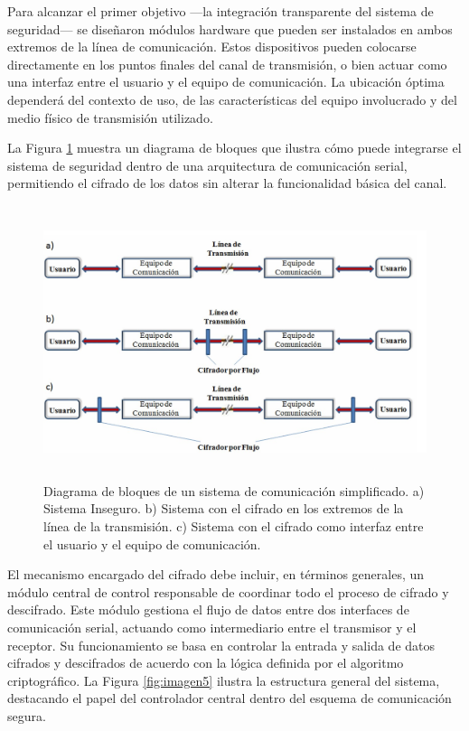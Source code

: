 Para alcanzar el primer objetivo —la integración transparente del sistema de seguridad— se diseñaron módulos hardware que pueden ser instalados en ambos extremos de la línea de comunicación. Estos dispositivos pueden colocarse directamente en los puntos finales del canal de transmisión, o bien actuar como una interfaz entre el usuario y el equipo de comunicación. La ubicación óptima dependerá del contexto de uso, de las características del equipo involucrado y del medio físico de transmisión utilizado.

La Figura \ref{fig:imagen4} muestra un diagrama de bloques que ilustra cómo puede integrarse el sistema de seguridad dentro de una arquitectura de comunicación serial, permitiendo el cifrado de los datos sin alterar la funcionalidad básica del canal.

\begin{figure}[h!] %
    \centering %
     \includegraphics[width=1\textwidth, height=8cm]{imagenes/img4} %
    \caption{Diagrama de bloques de un sistema de comunicación simplificado. a) Sistema Inseguro. 
b) Sistema con el cifrado en los extremos de la línea de la transmisión. c) Sistema con el cifrado 
como interfaz entre el usuario y el  equipo de comunicación. }
    \label{fig:imagen4} %
\end{figure} 

El mecanismo encargado del cifrado debe incluir, en términos generales, un módulo central de control responsable de coordinar todo el proceso de cifrado y descifrado. Este módulo gestiona el flujo de datos entre dos interfaces de comunicación serial, actuando como intermediario entre el transmisor y el receptor. Su funcionamiento se basa en controlar la entrada y salida de datos cifrados y descifrados de acuerdo con la lógica definida por el algoritmo criptográfico. La Figura \ref{fig:imagen5} ilustra la estructura general del sistema, destacando el papel del controlador central dentro del esquema de comunicación segura.

